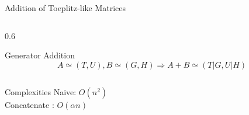 \begin{frame}{Addition of Toeplitz-like Matrices}
  \begin{columns}
    \begin{column}{0.6\textwidth}
      \begin{block}{Generator Addition}
        \[
           A \simeq (T,U), B \simeq (G,H) \Rightarrow A + B \simeq (T | G, U | H)
        \]
      \end{block}
    \end{column}
  \end{columns}
  \vspace{1em}
      \begin{block}{Complexities}
    Naive: $O(n^2)$           \\
    Concatenate : $O(\alpha n)$
  \end{block}
\end{frame}